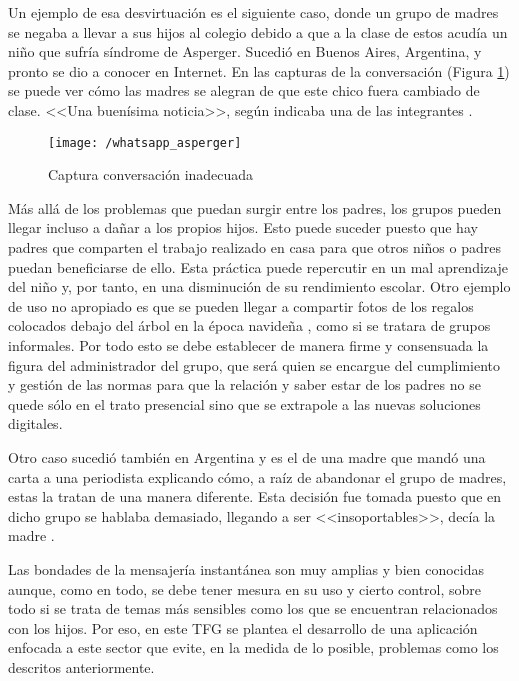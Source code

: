 \newpage

Un ejemplo de esa desvirtuación es el siguiente caso, donde un grupo de madres se negaba a llevar a sus hijos al colegio debido a que a la clase de estos acudía un niño que sufría síndrome de Asperger. Sucedió en Buenos Aires, Argentina, y pronto se dio a conocer en Internet.
En las capturas de la conversación (Figura \ref{fig:whatasper}) se puede ver cómo las madres se alegran de que este chico fuera cambiado de clase. <<Una buenísima noticia>>, según indicaba una de las integrantes \cite{Vanguardia2017}.

\begin{figure}[!h]
	\begin{center}
		\texttt{[image: /whatsapp\_asperger]}
		\caption{Captura conversación inadecuada}
		\label{fig:whatasper}
	\end{center}
\end{figure}

Más allá de los problemas que puedan surgir entre los padres, los grupos pueden llegar incluso a dañar a los propios hijos. Esto puede suceder puesto que hay padres que comparten el trabajo realizado en casa para que otros niños o padres puedan beneficiarse de ello. Esta práctica puede repercutir en un mal aprendizaje del niño y, por tanto, en una disminución de su rendimiento escolar. Otro ejemplo de uso no apropiado es que se pueden llegar a compartir fotos de los regalos colocados debajo del árbol en la época navideña \cite{Alias2017}, como si se tratara de grupos informales. Por todo esto se debe establecer de manera firme y consensuada la figura del administrador del grupo, que será quien se encargue del cumplimiento y gestión de las normas para que la relación y saber estar de los padres no se quede sólo en el trato presencial sino que se extrapole a las nuevas soluciones digitales.

Otro caso sucedió también en Argentina y es el de una madre que mandó una carta a una periodista explicando cómo, a raíz de abandonar el grupo de madres, estas la tratan de una manera diferente. Esta decisión fue tomada puesto que en dicho grupo se hablaba demasiado, llegando a ser <<insoportables>>, decía la madre \cite{Consuelo2017}.

\newpage

Las bondades de la mensajería instantánea son muy amplias y bien conocidas aunque, como en todo, se debe tener mesura en su uso y cierto control, sobre todo si se trata de temas más sensibles como los que se encuentran relacionados con los hijos. Por eso, en este \acs{TFG} se plantea el desarrollo de una aplicación enfocada a este sector que evite, en la medida de lo posible, problemas como los descritos anteriormente.

